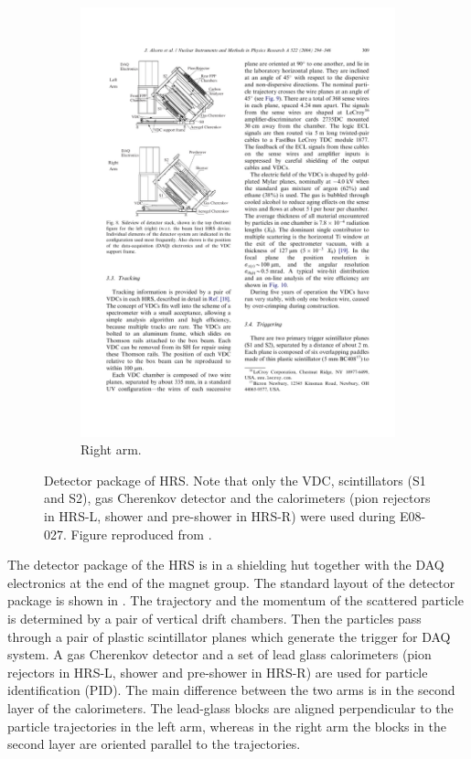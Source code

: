 \begin{figure}[b!]
\begin{subfigure}[t]{0.49\textwidth}
    \includegraphics[width=\textwidth]{figs/detector-package-right.pdf}
    \caption{Right arm. \label{C5S4SS2F1b}}
  \end{subfigure}
  \caption[Detector package of HRS.]{Detector package of HRS. Note that only the VDC, scintillators (S1 and S2), gas Cherenkov detector and the calorimeters (pion rejectors in HRS-L, shower and pre-shower in HRS-R) were used during E08-027. Figure reproduced from \cite{Alcorn2004}. \label{C5S4SS2F1}}
\end{figure}

The detector package of the HRS is in a shielding hut together with the DAQ electronics at the end of the magnet group. The standard layout of the detector package is shown in . The trajectory and the momentum of the scattered particle is determined by a pair of vertical drift chambers. Then the particles pass through a pair of plastic scintillator planes which generate the trigger for DAQ system. A gas Cherenkov detector and a set of lead glass calorimeters (pion rejectors in HRS-L, shower and pre-shower in HRS-R) are used for particle identification (PID). The main difference between the two arms is in the second layer of the calorimeters. The lead-glass blocks are aligned perpendicular to the particle trajectories in the left arm, whereas in the right arm the blocks in the second layer are oriented parallel to the trajectories.

